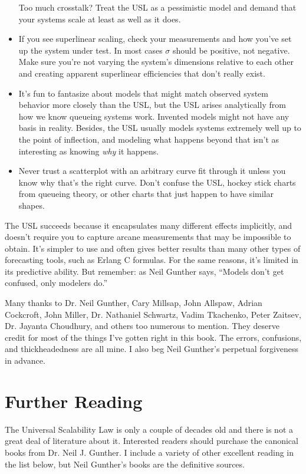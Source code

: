 \documentclass{vivid_layout}
\begin{document}
\begin{itemize}
Too much crosstalk? Treat the USL as a pessimistic model and demand that your
systems scale at least as well as it does.
\item If you see superlinear scaling, check your measurements and how you've set
up the system under test. In most cases $\sigma$ should be positive, not
negative. Make sure you're not varying the system's dimensions relative to each
other and creating apparent superlinear efficiencies that don't really exist.
\item It's fun to fantasize about models that might match observed system
behavior more closely than the USL, but the USL arises analytically from how we
know queueing systems work. Invented models might not have any basis in reality.
Besides, the USL usually models systems extremely well up to the point of
inflection, and modeling what happens beyond that isn't as interesting as
knowing {\itshape why} it happens.
\item Never trust a scatterplot with an arbitrary curve fit through it unless
you know why that's the right curve. Don't confuse the USL, hockey stick charts
from queueing theory, or other charts that just happen to have similar shapes.
\end{itemize}

The USL succeeds because it encapsulates many different effects implicitly, and
doesn't require you to capture arcane measurements that may be impossible to
obtain. It's simpler to use and often gives better results than many other types of
forecasting tools, such as Erlang C formulas. For the same reasons, it's limited
in its predictive ability. But remember: as Neil Gunther says, ``Models don't
get confused, only modelers do.''

Many thanks to Dr. Neil Gunther, Cary Millsap, John Allspaw, Adrian Cockcroft,
John Miller, Dr.  Nathaniel Schwartz, Vadim Tkachenko, Peter Zaitsev, Dr.
Jayanta Choudhury, and others too numerous to mention. They deserve credit for
most of the things I've gotten right in this book. The errors, confusions, and
thickheadedness are all mine. I also beg Neil Gunther's perpetual forgiveness in
advance.

\section{Further Reading}

The Universal Scalability Law is only a couple of decades old and there is not a
great deal of literature about it. Interested readers should purchase the
canonical books from Dr. Neil J. Gunther. I include a variety of other excellent
reading in the list below, but Neil Gunther's books are the definitive sources.
\end{document}
